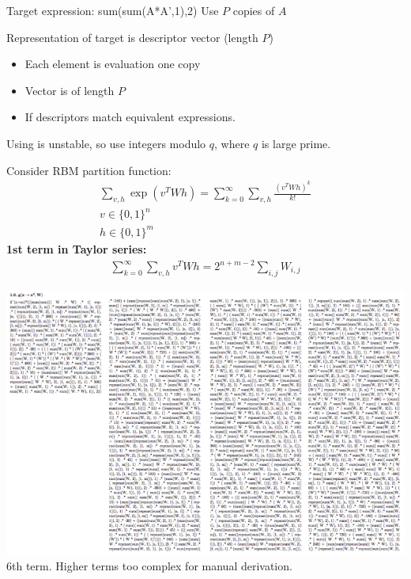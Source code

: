 \documentclass[landscape,a0b]{a0poster_csml_v2}
\begin{document}
\begin{poster}
\begin{PosterColumn}
Target expression: sum(sum(A*A’,1),2)
Use $P$ copies of $A$


Representation of target is descriptor vector (length $P$)
\begin{itemize}
  \item Each element is evaluation one copy
  \item Vector is of length $P$
  \item If descriptors match equivalent expressions.
\end{itemize}

Using is unstable, so use      
integers modulo $q$, where $q$ is large prime.




\end{PosterColumn}
\begin{PosterColumn} 


\begin{minipage}[hc]{0.57\textwidth}
  Consider RBM partition function:
  \begin{align*}
    \sum_{v,h} \exp(v^TWh) = \sum_{k=0}^\infty \sum_{v,h} \frac{(v^TWh)^k}{k!}\\
    v \in \{0, 1\}^n\\
    h \in \{0, 1\}^m
  \end{align*}
  {\bf 1st term in Taylor series:}
  \begin{align*}
    \sum_{k=0}^\infty \sum_{v,h} v^TWh = 2^{n + m - 2} \sum_{i, j}W_{i, j}
  \end{align*}
\end{minipage}
\hfill
\begin{minipage}[hc]{0.37\textwidth}
  \centering
  \includegraphics[width=\linewidth]{imgs/6th.png}
  6th term.
  Higher terms too complex for manual derivation. 
\end{minipage}
\vspace{0.5cm}
\\


\end{PosterColumn}
\end{poster}
\end{document}
